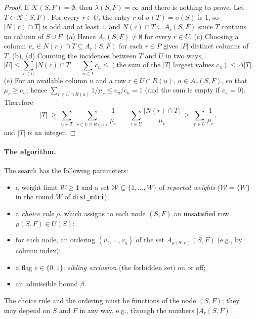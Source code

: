 \documentclass[11pt]{article}
\theoremstyle{definition}
\newcommand{\Kc}{\mathcal{K}}   %
\newcommand{\Wr}{\mathcal{W}}   %
\newcommand{\ttt}[1]{\texttt{#1}}
\begin{document}
\begin{proof}
If $\Kc(S,F)=\emptyset$, then $\lambda(S,F)=\infty$ and there is nothing to prove. Let $T\in\Kc(S,F)$. For every
$r\in U$, the entry $r$ of $\sigma(T)=\sigma(S)$ is $1$, so $|N(r)\cap T|$ is odd and at least $1$, and
$N(r)\cap T\subseteq A_r(S,F)$ since $T$ contains no column of $S\cup F$.
(a) Hence $A_r(S,F)\neq\emptyset$ for every $r\in U$.
(c) Choosing a column $u_r\in N(r)\cap T\subseteq A_r(S,F)$ for each $r\in P$ gives $|P|$ distinct columns of $T$.
(b), (d) Counting the incidences between $T$ and $U$ in two ways,
\[
  |U|\le\sum_{r\in U}|N(r)\cap T|=\sum_{u\in T}c_u\le(\text{the sum of the }|T|\text{ largest values }c_u)\le\Delta|T|.
\]
(e) For an available column $u$ and a row $r\in U\cap R(u)$, $u\in A_r(S,F)$, so that $\mu_r\ge c_u$; hence
$\sum_{r\in U\cap R(u)}1/\mu_r\le c_u/c_u=1$ (and the sum is empty if $c_u=0$). Therefore
\[
  |T|\ \ge\ \sum_{u\in T}\ \sum_{r\in U\cap R(u)}\frac1{\mu_r}\ =\ \sum_{r\in U}\frac{|N(r)\cap T|}{\mu_r}\
  \ge\ \sum_{r\in U}\frac1{\mu_r},
\]
and $|T|$ is an integer.
\end{proof}

\paragraph{The algorithm.} The search has the following parameters:
\begin{itemize}
  \item a weight limit $W\ge1$ and a set $\Wr\subseteq\{1,\dots,W\}$ of \emph{reported weights} ($\Wr=\{W\}$ in the
    round $W$ of \ttt{dist\_m4ri});
  \item a \emph{choice rule} $\rho$, which assigns to each node $(S,F)$ an unsatisfied row $\rho(S,F)\in U(S)$;
  \item for each node, an ordering $(v_1,\dots,v_q)$ of the set $A_{\rho(S,F)}(S,F)$ (e.g., by column index);
  \item a flag $\varepsilon\in\{0,1\}$: \emph{sibling exclusion} (the forbidden set) on or off;
  \item an admissible bound $\beta$.
\end{itemize}
The choice rule and the ordering must be functions of the node $(S,F)$; they may depend on $S$ and $F$ in any way,
e.g., through the numbers $|A_r(S,F)|$.
\end{document}
